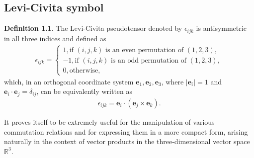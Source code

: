 \documentclass[12pt,a4paper]{report}
\theoremstyle{definition}
\newtheorem{definition}{Definition}
\theoremstyle{remark}
\theoremstyle{remark}
\begin{document}
\begin{appendices}

\chapter{Levi-Civita symbol}\label{levicivita}

\begin{definition}
The Levi-Civita pseudotensor denoted by $\epsilon_{ijk}$ is antisymmetric in all three indices and defined as
\begin{align*}
\epsilon_{ijk}=\left\{
\begin{array}{ll}
1,\text{if } (i,j,k)\text{ is an even permutation of } (1,2,3),\\
-1,\text{if } (i,j,k)\text{ is an odd permutation of } (1,2,3),\\
0,\text{otherwise},
\end{array}
\right.
\end{align*}
which, in an orthogonal coordinate system ${\textbf{e}_1,\textbf{e}_2,\textbf{e}_3}$, where $|\textbf{e}_i|=1$ and $\textbf{e}_i\cdot\textbf{e}_j=\delta_{ij}$, can be equivalently written  as
\begin{align*}
\epsilon_{ijk}=\textbf{e}_i\cdot\left(\textbf{e}_j\times\textbf{e}_k\right).
\end{align*}
\end{definition}
It proves itself to be extremely useful for the manipulation of various commutation relations and for expressing them in a more compact form, arising naturally in the context of vector products in the three-dimensional vector space $\mathbb{R}^3$.


\end{appendices}
\end{document}
